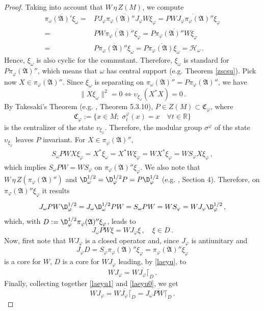 \documentclass[12pt]{amsart}
\numberwithin{equation}{section}
\def\ch{{\mathcal H}}
\def\ga{{\mathfrak A}} \def\gpa{{\mathfrak a}}
\def\gc{{\mathfrak C}}
\def\s{\sigma} \def\S{\Sigma}
\def\f{\varphi}\def\ff{\phi} \def\F{\Phi}
\def\om{\omega} \def\Om{\Omega}
\begin{document}
\begin{proof}
Taking into account that $W\,\eta\,Z(M)$, we compute
\begin{align*}
\overline{\pi_\om(\ga)'\xi_\om}=&\overline{PJ_\f\pi_\f(\ga)''J_\f W\xi_\f}=\overline{PWJ_\f\pi_\f(\ga)''\xi_\f}\\
=&\overline{PW\pi_\f(\ga)''\xi_\f}=\overline{P\pi_\f(\ga)''W\xi_\f}\\
=&\overline{P\pi_\f(\ga)''\xi_\om}=\overline{P\pi_\f(\ga)\xi_\om}=\ch_\om\,.
\end{align*}
Hence, $\xi_\om$ is also cyclic for the commutant. Therefore, $\xi_\om$ is standard for $P\pi_\f(\ga)''$, which means that $\om$ has central support (e.g. Theorem \ref{zscsu}).
Pick now $X\in\pi_\f(\ga)''$. Since $\xi_\om$ is separating on 
$\pi_\om(\ga)''=P\pi_\f(\ga)''$, we have 
$$
\|X\xi_{\om}\|^2=0\iff \upsilon_{\xi_\om}(X^*X)=0\,.
$$
By Takesaki's Theorem (e.g. \cite{BR}, Theorem 5.3.10), 
$P\in Z(M)\subset\gc_\f$, where
 $$\gc_\f:=\{x\in M ;\; \sigma^\f_t (x)=x  \quad\forall t\in\mathbb R \}$$
 is the centralizer of the state $v_{\xi_\f}$. Therefore, the modular group $\s^{\f}$ of the state
$\upsilon_{\xi_\f}$ leaves $P$ invariant. For $X\in\pi_\f(\ga)''$,
\begin{align*}
S_\om PWX\xi_\f=X^*\xi_\om=X^*W\xi_\f
=WX^*\xi_\f
=WS_\f X\xi_\f\,,
\end{align*}
which implies $S_{\om} PW=WS_{\f}$ on $\pi_\f(\ga)''\xi_\f$. We also note that $W\,\eta\,Z(\pi_\f(\ga)'')$ and
$\D^{1/2}_\om=\D^{1/2}_\f P=P\D^{1/2}_\f$ (e.g. \cite{S}, Section 4). Therefore, 
on $\pi_\f(\ga)''\xi_\f$ it results
\begin{equation}
\label{laeyu0}
J_\om PW\D^{1/2}_\f=J_\om \D^{1/2}_\om PW=S_\om PW=WS_\f=WJ_\f\D^{1/2}_\f\,,
\end{equation}
which, with $D:=\D^{1/2}_\f\pi_\f(\ga)''\xi_\f$, leads to
\begin{equation}
\label{laeyu}
J_\om PW\xi=WJ_\f\xi\,,\quad \xi\in D\,.
\end{equation}
Now, first note that $WJ_\f$ is a closed operator and, since $J_\f$ is antiunitary and
$$
J_\f D=S_\f\pi_\f(\ga)''\xi_\f=\pi_\f(\ga)''\xi_\f
$$
is a core for $W$, $D$ is a core for $WJ_\f$ leading, by \eqref{laeyu}, to
\begin{equation}
\label{laeyu1}
WJ_\f=\overline{WJ_\f\lceil_D}\,.
\end{equation}
Finally, collecting together \eqref{laeyu1} and \eqref{laeyu0}, we get
$$
WJ_\f=\overline{WJ_\f\lceil_D}=\overline{J_\om PW\lceil_D}\,.
$$


\end{proof}
\end{document}
